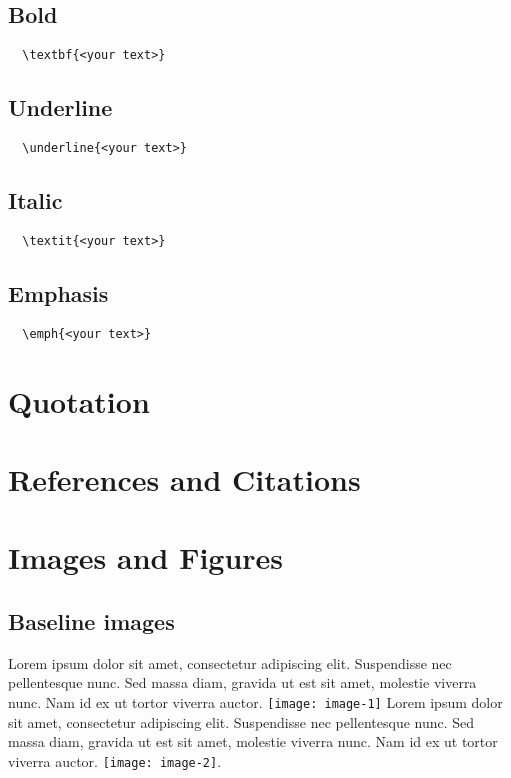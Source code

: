 \subsection{Bold}
\begin{lstlisting}
  \textbf{<your text>}
\end{lstlisting}

\subsection{Underline}
\begin{lstlisting}
  \underline{<your text>}
\end{lstlisting}

\subsection{Italic}
\begin{lstlisting}
  \textit{<your text>}
\end{lstlisting}

\subsection{Emphasis}
\begin{lstlisting}
  \emph{<your text>}
\end{lstlisting}

\section{Quotation}

\section{References and Citations}

\section{Images and Figures}

\subsection{Baseline images}

Lorem ipsum dolor sit amet, consectetur adipiscing elit. Suspendisse nec pellentesque nunc. Sed massa diam, gravida ut est sit amet, molestie viverra nunc. Nam id ex ut tortor viverra auctor. \texttt{[image: image-1]} Lorem ipsum dolor sit amet, consectetur adipiscing elit. Suspendisse nec pellentesque nunc. Sed massa diam, gravida ut est sit amet, molestie viverra nunc. Nam id ex ut tortor viverra auctor. \texttt{[image: image-2]}.

